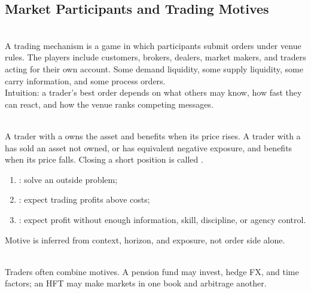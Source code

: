 \subsection{Market Participants and Trading Motives}

\begin{model} \\
A trading mechanism is a game in which participants submit orders under venue rules. The players include customers, brokers, dealers, market makers, and traders acting for their own account. Some demand liquidity, some supply liquidity, some carry information, and some process orders.\\
Intuition: a trader's best order depends on what others may know, how fast they can react, and how the venue ranks competing messages.
\end{model}

\begin{notation} \\
A trader with a  owns the asset and benefits when its price rises. A trader with a  has sold an asset not owned, or has equivalent negative exposure, and benefits when its price falls. Closing a short position is called .
\end{notation}

\begin{taxonomy} 
\begin{enumerate}[label=\roman*.]
\setlength{\itemsep}{0pt}
\item {}: solve an outside problem;
\item {}: expect trading profits above costs;
\item {}: expect profit without enough information, skill, discipline, or agency control.
\end{enumerate}
Motive is inferred from context, horizon, and exposure, not order side alone.
\end{taxonomy}

\begin{caveat} \\
Traders often combine motives. A pension fund may invest, hedge FX, and time factors; an HFT may make markets in one book and arbitrage another.
\end{caveat}

